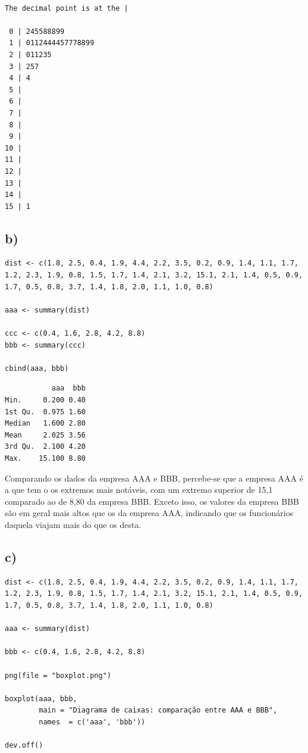 \documentclass[11pt]{article}
\begin{document}
\begin{verbatim}

The decimal point is at the |

 0 | 245588899
 1 | 0112444457778899
 2 | 011235
 3 | 257
 4 | 4
 5 | 
 6 | 
 7 | 
 8 | 
 9 | 
10 | 
11 | 
12 | 
13 | 
14 | 
15 | 1

\end{verbatim}

\subsection*{b)}
\label{sec:orgae22e82}

\begin{verbatim}
dist <- c(1.8, 2.5, 0.4, 1.9, 4.4, 2.2, 3.5, 0.2, 0.9, 1.4, 1.1, 1.7, 1.2, 2.3, 1.9, 0.8, 1.5, 1.7, 1.4, 2.1, 3.2, 15.1, 2.1, 1.4, 0.5, 0.9, 1.7, 0.5, 0.8, 3.7, 1.4, 1.8, 2.0, 1.1, 1.0, 0.8)

aaa <- summary(dist)

ccc <- c(0.4, 1.6, 2.8, 4.2, 8.8)
bbb <- summary(ccc)

cbind(aaa, bbb)
\end{verbatim}

\begin{verbatim}
           aaa  bbb
Min.     0.200 0.40
1st Qu.  0.975 1.60
Median   1.600 2.80
Mean     2.025 3.56
3rd Qu.  2.100 4.20
Max.    15.100 8.80
\end{verbatim}


Comparando os dados da empresa AAA e BBB, percebe-se que a empresa AAA é a que tem o os extremos mais notáveis, com um extremo superior de 15,1 comparado ao de 8,80 da empresa BBB. Exceto isso, os valores da empresa BBB são em geral mais altos que os da empresa AAA, indicando que os funcionários daquela viajam mais do que os desta.

\subsection*{c)}
\label{sec:orgd8e4dc9}

\begin{verbatim}
dist <- c(1.8, 2.5, 0.4, 1.9, 4.4, 2.2, 3.5, 0.2, 0.9, 1.4, 1.1, 1.7,
1.2, 2.3, 1.9, 0.8, 1.5, 1.7, 1.4, 2.1, 3.2, 15.1, 2.1, 1.4, 0.5, 0.9,
1.7, 0.5, 0.8, 3.7, 1.4, 1.8, 2.0, 1.1, 1.0, 0.8)

aaa <- summary(dist)

bbb <- c(0.4, 1.6, 2.8, 4.2, 8.8)

png(file = "boxplot.png")

boxplot(aaa, bbb,
		main = "Diagrama de caixas: comparação entre AAA e BBB",
		names  = c('aaa', 'bbb'))

dev.off()
\end{verbatim}
\end{document}
